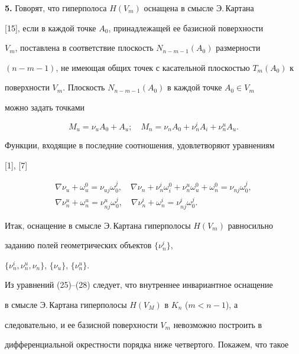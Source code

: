  


 


{\bf 5.} Говорят, что гиперполоса $H(V_m)$ оснащена в смысле Э.\,Картана 


[15], если в каждой точке $A_0$, принадлежащей ее базисной поверхности 


$V_m$, поставлена в соответствие плоскость $N_{n-m-1}(A_0)$ размерности 


$(n-m-1)$, не имеющая общих точек с касательной плоскостью $T_m(A_0)$ к 


поверхности $V_m$. Плоскость $N_{n-m-1}(A_0)$ в каждой точке $A_0\in V_m$ 


можно задать точками 


$$ 


M_u=\nu_u A_0+A_u;\quad M_n=\nu_n A_0+\nu^i_n A_i+\nu^u_n A_u. 


$$ 


Функции, входящие в последние соотношения, удовлетворяют уравнениям 


[1], [7]


\begin{gather*} 


\nabla\nu_u+\omega^0_u=\nu_{uj}\omega^j_0,\quad 


\nabla\nu_n+\nu^i_n\omega^0_i+\nu^u_n\omega^0_u+ 


\omega^0_n=\nu_{nj}\omega^j_0,\\ 


\nabla\nu^u_n+\omega^u_n=\nu^u_{nj}\omega^j_0,\quad 


\nabla\nu^i_n+\omega^i_n=\nu^i_{nj}\omega^j_0. 


\end{gather*} 


 


Итак, оснащение в смысле Э.\,Картана гиперполосы $H(V_m)$ равносильно 


заданию полей геометрических объектов $\{\nu^i_n\}$, 


$\{\nu^i_n,\nu^u_n,\nu_n\}$, $\{\nu_u\}$, $\{\nu^u_n\}$. 


 


Из уравнений (25)--(28) следует, что внутреннее инвариантное оснащение 


в смысле Э.\,Картана гиперполосы $H(V_M)$ в $K_n$ ($m<n-1$), а 


следовательно, и ее базисной поверхности $V_m$ невозможно построить в 


дифференциальной окрестности порядка ниже четвертого. Покажем, что такое 


